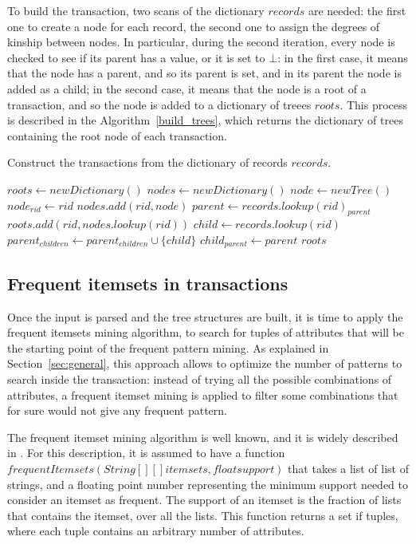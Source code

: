 \documentclass{acm_proc_article-sp-sigmod09}
\begin{document}
To build the transaction, two scans of the dictionary $records$ are needed: the first one to create a node for each record, the second one to assign the degrees of kinship between nodes. In particular, during the second iteration, every node is checked to see if its parent has a value, or it is set to $\bot$: in the first case, it means that the node has a parent, and so its parent is set, and in its parent the node is added as a child; in the second case, it means that the node is a root of a transaction, and so the node is added to a dictionary of treees $roots$. This process is described in the Algorithm~\ref{build_trees}, which returns the dictionary of trees containing the root node of each transaction.

\begin{algorithm}
\caption{Construct the transactions from the dictionary of records $records$.}
\label{build_trees}
\begin{algorithmic}[1]
\State $roots \gets new Dictionary()$
\State $nodes \gets new Dictionary()$
	\State $node \gets new Tree()$ 
	\State $node_{rid} \gets rid$
	\State $nodes.add(rid, node)$
\EndFor
{}
	\State $parent \gets records.lookup(rid)_{parent}$
		\State $roots.add(rid, nodes.lookup(rid))$
	\Else
		\State $child \gets records.lookup(rid)$
		\State $parent_{children} \gets parent_{children} \cup \{child\}$
		\State $child_{parent} \gets parent$
	\EndIf
\EndFor
\Return $roots$
\EndFunction
\end{algorithmic}
\end{algorithm}

\subsection{Frequent itemsets in transactions}
Once the input is parsed and the tree structures are built, it is time to apply the frequent itemsets mining algorithm, to search for tuples of attributes that will be the starting point of the frequent pattern mining. As explained in Section~\ref{sec:general}, this approach allows to optimize the number of patterns to search inside the transaction: instead of trying all the possible combinations of attributes, a frequent itemset mining is applied to filter some combinations that for sure would not give any frequent pattern.

The frequent itemset mining algorithm is well known, and it is widely described in \cite{agrawal1994fast}. For this description, it is assumed to have a function $frequentItemsets(String[][] itemsets, float support)$ that takes a list of list of strings, and a floating point number representing the minimum support needed to consider an itemset as frequent. The support of an itemset is the fraction of lists that contains the itemset, over all the lists. This function returns a set if tuples, where each tuple contains an arbitrary number of attributes.
\end{document}

